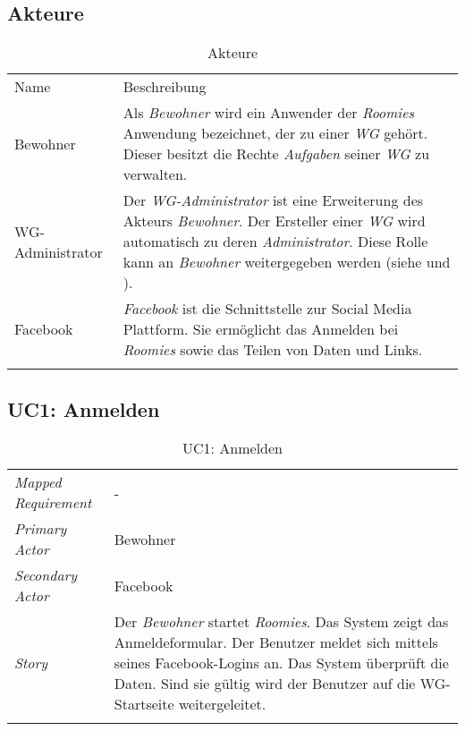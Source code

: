 \subsection{Akteure}
\begin{table}[H]
	\tablestyle
	\tablealtcolored
	\begin{tabularx}{\textwidth}{lX}
		\tableheadcolor
		\tablehead Name &
		\tablehead Beschreibung \tabularnewline
		\tablebody
			Bewohner &
			Als \emph{Bewohner} wird ein Anwender der \emph{Roomies} Anwendung bezeichnet, der zu einer \emph{WG} gehört. \newline
			Dieser besitzt die Rechte \emph{Aufgaben} seiner \emph{WG} zu verwalten.
			\tabularnewline
			WG-Administrator &
			Der \emph{WG-Administrator} ist eine Erweiterung des Akteurs \emph{Bewohner}. Der Ersteller einer \emph{WG} wird automatisch zu deren \emph{Administrator}. Diese Rolle kann an \emph{Bewohner} weitergegeben werden (siehe \nameref{subsec:uc4} und \nameref{subsec:uc10}).
			\tabularnewline
			Facebook &
			\emph{Facebook} ist die Schnittstelle zur Social Media Plattform. Sie ermöglicht das Anmelden bei \emph{Roomies} sowie das Teilen von Daten und Links.
			\tabularnewline
		\tableend
	\end{tabularx}
	\caption{Akteure}
\end{table}

\subsection{UC1: Anmelden}\label{subsec:uc1}
\begin{table}[H]
	\tablestyle
	\tablealtcolored
	\begin{tabularx}{\textwidth}{lX}
		\tablebody
			\textit{Mapped Requirement} &
			-
			\tabularnewline
			\textit{Primary Actor} &
			Bewohner
			\tabularnewline
			\textit{Secondary Actor} &
			Facebook
			\tabularnewline
			\textit{Story} &
			Der \emph{Bewohner} startet \emph{Roomies}. Das System zeigt das Anmeldeformular. Der Benutzer meldet sich mittels seines Facebook-Logins an. Das System überprüft die Daten. Sind sie gültig wird der Benutzer auf die WG-Startseite weitergeleitet.
			\tabularnewline
		\tableend
	\end{tabularx}
	\caption{UC1: Anmelden}
\end{table}


